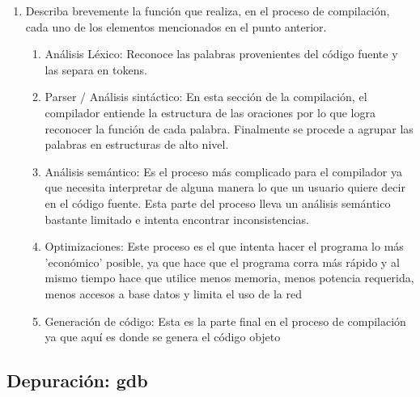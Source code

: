 \documentclass[12pt,a4paper]{article}
\begin{document}
\begin{enumerate}
\item Describa brevemente la función que realiza, en el proceso de compilación, cada uno de los elementos mencionados en el punto anterior.

\begin{enumerate}
    
    \item Análisis Léxico: Reconoce las palabras provenientes del código fuente y las separa en tokens.
    
    \item Parser / Análisis sintáctico: En esta sección de la compilación, el compilador entiende la estructura de las oraciones por lo que logra reconocer la función de cada palabra. Finalmente se procede a agrupar las palabras en estructuras de alto nivel.
    
    \item Análisis semántico: Es el proceso más complicado para el compilador ya que necesita interpretar de alguna manera lo que un usuario quiere decir en el código fuente. Esta parte del proceso lleva un análisis semántico bastante limitado e intenta encontrar inconsistencias.
    
    \item Optimizaciones: Este proceso es el que intenta hacer el programa lo más 'económico' posible, ya que hace que el programa corra más rápido y al mismo tiempo hace que utilice menos memoria, menos potencia requerida, menos accesos a base datos y limita el uso de la red
    
    \item Generación de código: Esta es la parte final en el proceso de compilación ya que aquí es donde se genera el código objeto 
    
    \end{enumerate}
    
\end{enumerate}

\subsection{Depuración: gdb}
\end{document}
